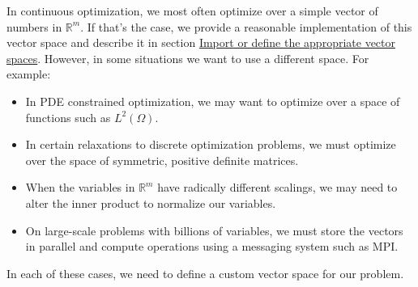 \documentclass{report}
\newcommand{\re}{\mathbb{R}}
\newcommand{\secimportvs}{Import or define the appropriate vector spaces}
\begin{document}
        In continuous optimization, we most often optimize over a simple vector of numbers in $\re^m$.  If that's the case, we provide a reasonable implementation of this vector space and describe it in section \hyperref[sec:importvs]{\secimportvs}.  However, in some situations we want to use a different space.  For example:
\begin{itemize}
    \item In PDE constrained optimization, we may want to optimize over a space of functions such as $L^2(\Omega)$.
    \item In certain relaxations to discrete optimization problems, we must optimize over the space of symmetric, positive definite matrices.
    \item When the variables in $\re^m$ have radically different scalings, we may need to alter the inner product to normalize our variables.
    \item On large-scale problems with billions of variables, we must store the vectors in parallel and compute operations using a messaging system such as MPI.
\end{itemize}
\noindent In each of these cases, we need to define a custom vector space for our problem.
\end{document}
